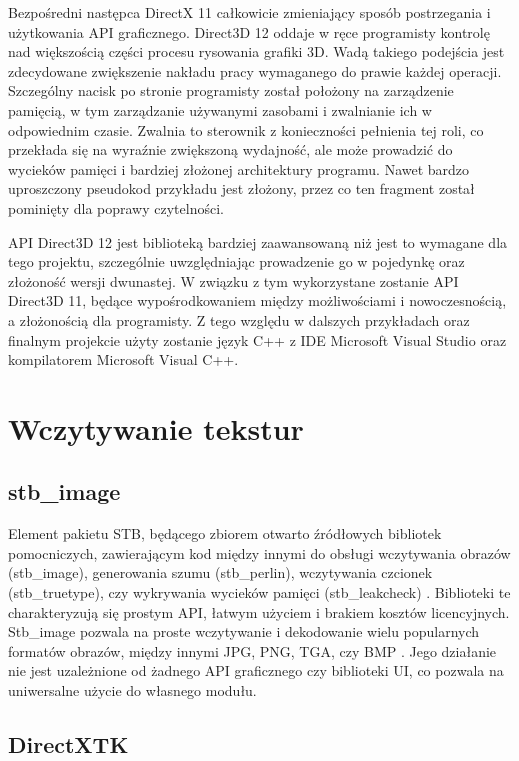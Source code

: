 Bezpośredni następca DirectX 11 całkowicie zmieniający sposób
postrzegania i użytkowania API graficznego. Direct3D 12 oddaje w ręce
programisty kontrolę nad większością części procesu rysowania grafiki
3D. Wadą takiego podejścia jest zdecydowane zwiększenie nakładu pracy
wymaganego do prawie każdej operacji. Szczególny nacisk po stronie
programisty został położony na zarządzenie pamięcią, w tym zarządzanie
używanymi zasobami i zwalnianie ich w odpowiednim czasie. Zwalnia to
sterownik z konieczności pełnienia tej roli, co przekłada się na
wyraźnie zwiększoną wydajność, ale może prowadzić do wycieków pamięci i
bardziej złożonej architektury programu. Nawet bardzo uproszczony pseudokod przykładu jest złożony, przez co ten fragment został pominięty dla poprawy czytelności.

API Direct3D 12 jest biblioteką bardziej zaawansowaną niż jest to
wymagane dla tego projektu, szczególnie uwzględniając prowadzenie go w
pojedynkę oraz złożoność wersji dwunastej. W związku z tym wykorzystane
zostanie API Direct3D 11, będące wypośrodkowaniem między możliwościami i
nowoczesnością, a złożonością dla programisty. Z tego względu w dalszych
przykładach oraz finalnym projekcie użyty zostanie język C++ z IDE
Microsoft Visual Studio oraz kompilatorem Microsoft Visual C++.

\section{Wczytywanie tekstur}

\subsection{stb\_image}

Element pakietu STB, będącego zbiorem otwarto źródłowych bibliotek
pomocniczych, zawierającym kod między innymi do obsługi wczytywania
obrazów (stb\_image), generowania szumu (stb\_perlin), wczytywania
czcionek (stb\_truetype), czy wykrywania wycieków pamięci
(stb\_leakcheck) \cite{github:stb:2024}. Biblioteki te charakteryzują się prostym API,
łatwym użyciem i brakiem kosztów licencyjnych. Stb\_image pozwala na proste wczytywanie i dekodowanie wielu popularnych
formatów obrazów, między innymi JPG, PNG, TGA, czy BMP \cite{github:stb:2024}. Jego
działanie nie jest uzależnione od żadnego API graficznego czy biblioteki
UI, co pozwala na uniwersalne użycie do własnego modułu. 

\subsection{DirectXTK}

